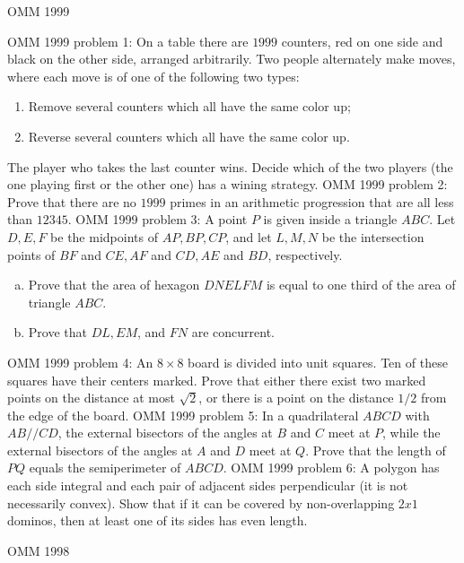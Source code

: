 OMM 1999 

OMM 1999 problem 1:  On a table there are $1999$ counters, red on one side and black on the other side, arranged arbitrarily. Two people alternately make moves, where each move is of one of the following two types:
\begin{enumerate}[(1)]
  \item Remove several counters which all have the same color up;
  \item Reverse several counters which all have the same color up.
\end{enumerate}
The player who takes the last counter wins. Decide which of the two players (the one playing first or the other one) has a wining strategy. 
OMM 1999 problem 2:  Prove that there are no $1999$ primes in an arithmetic progression that are all less than $12345$. 
OMM 1999 problem 3:  A point $P$ is given inside a triangle $ABC$. Let $D,E,F$ be the midpoints of $AP,BP,CP$, and let $L,M,N$ be the intersection points of $ BF$ and $CE, AF$ and $CD, AE$ and $BD$, respectively.
\begin{enumerate}[(a)]
  \item Prove that the area of hexagon $DNELFM$ is equal to one third of the area of triangle $ABC$.
  \item Prove that $DL,EM$, and $FN$ are concurrent.
\end{enumerate} 
OMM 1999 problem 4:  An $8 \times 8$ board is divided into unit squares. Ten of these squares have their centers marked. Prove that either there exist two marked points on the distance at most $\sqrt2$, or there is a point on the distance $1/2$ from the edge of the board. 
OMM 1999 problem 5:  In a quadrilateral $ABCD$ with $AB  // CD$, the external bisectors of the angles at $B$ and $C$ meet at $P$, while the external bisectors of the angles at $A$ and $D$ meet at $Q$. Prove that the length of $PQ$ equals the semiperimeter of $ABCD$. 
OMM 1999 problem 6:  A polygon has each side integral and each pair of adjacent sides perpendicular (it is not necessarily convex). Show that if it can be covered by non-overlapping $2 x 1$ dominos, then at least one of its sides has even length. 

OMM 1998 

